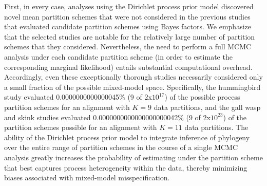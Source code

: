 \documentclass[11pt]{article}
\newcommand{\brmadd}[1]{{\color{blue}{#1}}}
\begin{document}
\brmadd{In this section, we consider practical comparisons between the conventional mixed-model approach, the DPP approach described by Wu et al., and our DPP approach.  The nature of the comparison is that the first approach makes overly stringent/inflexible assumptions about biologically plausible patterns of process heterogeneity, whereas the Wu et al. approach makes too little use of this relevant prior information.}

First, in every case, analyses using the Dirichlet process prior model discovered novel mean partition schemes that were not considered in the previous studies that evaluated candidate partition schemes using Bayes factors.  
We emphasize that the selected studies are notable for the relatively large number of partition schemes that they considered.  
Nevertheless, the need to perform a full MCMC analysis under each candidate partition scheme (in order to estimate the corresponding marginal likelihood) entails substantial computational overhead.
Accordingly, even these exceptionally thorough studies necessarily considered only a small fraction of the possible mixed-model space.  
Specifically, the hummingbird study evaluated 0.0000000000000045\% (9 of $2$x$10^{17}$) of the possible process partition schemes for an alignment with $K=9$ data partitions, and the gall wasp and skink studies evaluated 0.0000000000000000000042\% ($9$ of $2$x$10^{23}$) of the partition schemes possible for an alignment with $K=11$ data partitions.
The ability of the Dirichlet process prior model to integrate inference of phylogeny over the entire range of partition schemes in the course of a single MCMC analysis greatly increases the probability of estimating under the partition scheme that best captures process heterogeneity within the data, thereby minimizing biases associated with mixed-model misspecification.
\end{document}
